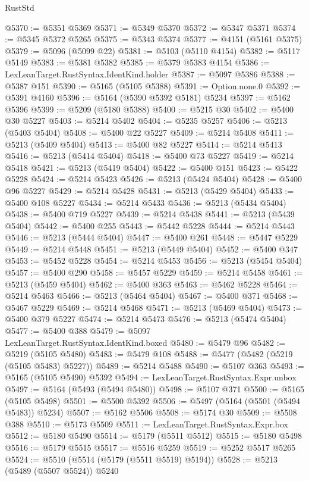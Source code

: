 \begin{lexlean}{RustStd}
\begin{coremodule}
@5370 := @5351 @5369
@5371 := @5349 @5370
@5372 := @5347 @5371
@5374 := @5345 @5372 @5265
@5375 := @5343 @5374
@5377 := @4151 (@5161 @5375)
@5379 := @5096 (@5099 @22)
@5381 := @5103 (@5110 @4154)
@5382 := @5117 @5149
@5383 := @5381 @5382
@5385 := @5379 @5383 @4154
@5386 := LexLeanTarget.RustSyntax.IdentKind.holder
@5387 := @5097 @5386
@5388 := @5387 @151
@5390 := @5165 (@5105 @5388)
@5391 := Option.none.{0}
@5392 := @5391 @4160
@5396 := @5164 (@5390 @5392 @5181) @5234
@5397 := @5162 @5396
@5399 := @5209 (@5180 @5388)
@5400 := @5215 @30
@5402 := @5400 @30 @5227
@5403 := @5214 @5402
@5404 := @5235 @5257
@5406 := @5213 (@5403 @5404)
@5408 := @5400 @22 @5227
@5409 := @5214 @5408
@5411 := @5213 (@5409 @5404)
@5413 := @5400 @82 @5227
@5414 := @5214 @5413
@5416 := @5213 (@5414 @5404)
@5418 := @5400 @73 @5227
@5419 := @5214 @5418
@5421 := @5213 (@5419 @5404)
@5422 := @5400 @151
@5423 := @5422 @5228
@5424 := @5214 @5423
@5426 := @5213 (@5424 @5404)
@5428 := @5400 @96 @5227
@5429 := @5214 @5428
@5431 := @5213 (@5429 @5404)
@5433 := @5400 @108 @5227
@5434 := @5214 @5433
@5436 := @5213 (@5434 @5404)
@5438 := @5400 @719 @5227
@5439 := @5214 @5438
@5441 := @5213 (@5439 @5404)
@5442 := @5400 @255
@5443 := @5442 @5228
@5444 := @5214 @5443
@5446 := @5213 (@5444 @5404)
@5447 := @5400 @261
@5448 := @5447 @5229
@5449 := @5214 @5448
@5451 := @5213 (@5449 @5404)
@5452 := @5400 @347
@5453 := @5452 @5228
@5454 := @5214 @5453
@5456 := @5213 (@5454 @5404)
@5457 := @5400 @290
@5458 := @5457 @5229
@5459 := @5214 @5458
@5461 := @5213 (@5459 @5404)
@5462 := @5400 @363
@5463 := @5462 @5228
@5464 := @5214 @5463
@5466 := @5213 (@5464 @5404)
@5467 := @5400 @371
@5468 := @5467 @5229
@5469 := @5214 @5468
@5471 := @5213 (@5469 @5404)
@5473 := @5400 @379 @5227
@5474 := @5214 @5473
@5476 := @5213 (@5474 @5404)
@5477 := @5400 @388
@5479 := @5097 LexLeanTarget.RustSyntax.IdentKind.boxed
@5480 := @5479 @96
@5482 := @5219 (@5105 @5480)
@5483 := @5479 @108
@5488 := @5477 (@5482 (@5219 (@5105 @5483) @5227))
@5489 := @5214 @5488
@5490 := @5107 @363
@5493 := @5165 (@5105 @5490) @5392
@5494 := LexLeanTarget.RustSyntax.Expr.unbox
@5497 := @5164 (@5493 (@5494 @5480))
@5498 := @5107 @371
@5500 := @5165 (@5105 @5498)
@5501 := @5500 @5392
@5506 := @5497 (@5164 (@5501 (@5494 @5483)) @5234)
@5507 := @5162 @5506
@5508 := @5174 @30
@5509 := @5508 @388
@5510 := @5173 @5509
@5511 := LexLeanTarget.RustSyntax.Expr.box
@5512 := @5180 @5490
@5514 := @5179 (@5511 @5512)
@5515 := @5180 @5498
@5516 := @5179 @5515
@5517 := @5516 @5259
@5519 := @5252 @5517 @5265
@5524 := @5510 (@5514 (@5179 (@5511 @5519) @5194))
@5528 := @5213 (@5489 (@5507 @5524)) @5240

\end{coremodule}
\end{lexlean}
